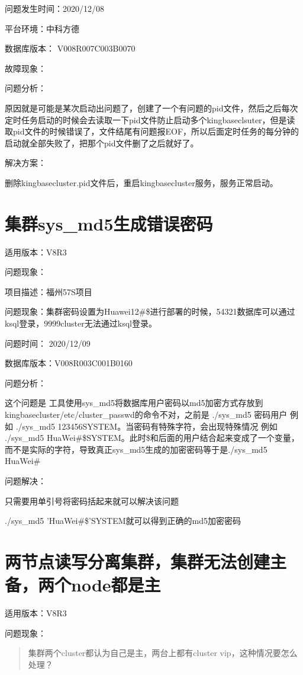 \documentclass[a4,10pt,oneside,english]{sphinxmanual}
\begin{document}
问题发生时间：2020/12/08

平台环境：中科方德

数据库版本： V008R007C003B0070

故障现象：

问题分析：

原因就是可能是某次启动出问题了，创建了一个有问题的pid文件，然后之后每次定时任务启动的时候会去读取一下pid文件防止启动多个kingbaseclsuter，但是读取pid文件的时候错误了，文件结尾有问题报EOF，所以后面定时任务的每分钟的启动就全部失败了，把那个pid文件删了之后就好了。

解决方案：

删除kingbasecluster.pid文件后，重启kingbasecluster服务，服务正常启动。


\section{集群sys\_md5生成错误密码}
\label{\detokenize{cluster_faq:sys-md5}}
适用版本：V8R3

问题现象：

项目描述：福州57S项目

问题现象：集群密码设置为Huawei12\#\$进行部署的时候，54321数据库可以通过ksql登录，9999cluster无法通过ksql登录。

问题时间： 2020/12/09

数据库版本：V008R003C001B0160

问题分析：

这个问题是 工具使用sys\_md5将数据库用户密码以md5加密方式存放到kingbasecluster/etc/cluster\_passwd的命令不对，之前是 ./sys\_md5 密码用户 例如 ./sys\_md5 123456SYSTEM。当密码有特殊字符，会出现特殊情况 例如 ./sys\_md5 HuaWei\#\$SYSTEM。此时\$和后面的用户结合起来变成了一个变量，而不是实际的字符，导致真正sys\_md5生成的加密密码等于是./sys\_md5 HuaWei\#

问题解决：

只需要用单引号将密码括起来就可以解决该问题

./sys\_md5 'HuaWei\#\$'SYSTEM就可以得到正确的md5加密密码


\section{两节点读写分离集群，集群无法创建主备，两个node都是主}
\label{\detokenize{cluster_faq:node}}
适用版本：V8R3

问题现象：
\begin{quote}

集群两个cluster都认为自己是主，两台上都有cluster vip，这种情况要怎么处理？
\end{quote}
\end{document}
